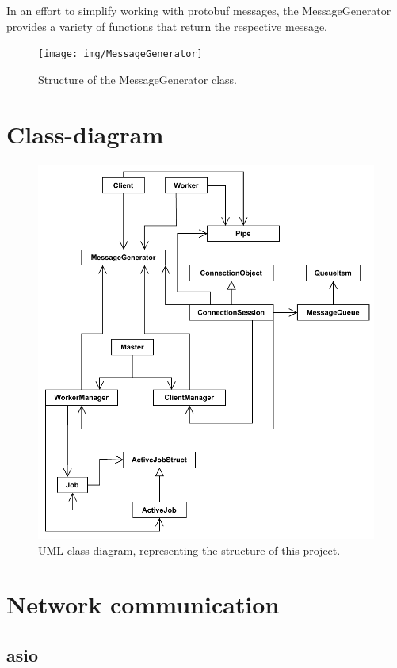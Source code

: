 \documentclass[12pt, letterpaper]{article}
\begin{document}
In an effort to simplify working with protobuf messages, the MessageGenerator provides a variety of functions that return the respective message. 

\begin{figure}[h]
	\centering
	\texttt{[image: img/MessageGenerator]}
	\caption{Structure of the MessageGenerator class.}
	\label{fig:classes_MessageGenerator}
\end{figure}

\pagebreak
\section{Class-diagram}

\begin{figure}[h]
	\centering
	\includegraphics[width=0.9\linewidth]{img/ClassDiagram}
	\caption{UML class diagram, representing the structure of this project.}
	\label{fig:classDiagram}
\end{figure}

\section{Network communication}

\subsection{asio}
\end{document}
